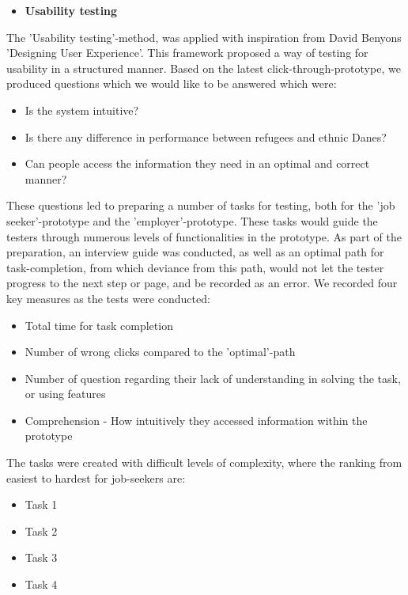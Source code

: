 \begin{itemize}
    \item \bf{Usability testing}
\end{itemize}

The 'Usability testing'-method, was applied with inspiration from David Benyons 'Designing User Experience'\cite{benyon2019designing}. This framework proposed a way of testing for usability in a structured manner. Based on the latest click-through-prototype, we produced questions which we would like to be answered which were:

\begin{itemize}
    \item Is the system intuitive?
    \item Is there any difference in performance between refugees and ethnic Danes?
    \item Can people access the information they need in an optimal and correct manner?
\end{itemize}

These questions led to preparing a number of tasks for testing, both for the 'job seeker'-prototype and the 'employer'-prototype. These tasks would guide the testers through numerous levels of functionalities in the prototype. As part of the preparation, an interview guide was conducted, as well as an optimal path for task-completion, from which deviance from this path, would not let the tester progress to the next step or page, and be recorded as an error. We recorded four key measures as the tests were conducted:

\begin{itemize}
    \item Total time for task completion
    \item Number of wrong clicks compared to the 'optimal'-path
    \item Number of question regarding their lack of understanding in solving the task, or using features
    \item Comprehension - How intuitively they accessed information within the prototype
\end{itemize}

The tasks were created with difficult levels of complexity, where the ranking from easiest to hardest for job-seekers are:

\begin{itemize}
    \item Task 1
    \item Task 2
    \item Task 3
    \item Task 4
\end{itemize}

